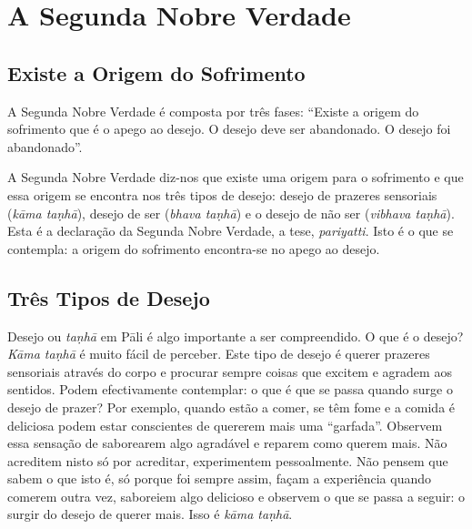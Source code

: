 
\chapter{A Segunda Nobre Verdade}

\section{Existe a Origem do Sofrimento}

A Segunda Nobre Verdade é composta por três fases: “Existe a origem do
sofrimento que é o apego ao desejo. O desejo deve ser abandonado. O desejo foi
abandonado”.

A Segunda Nobre Verdade diz-nos que existe uma origem para o sofrimento e que
essa origem se encontra nos três tipos de desejo: desejo de prazeres sensoriais
(\emph{kāma taṇhā}), desejo de ser (\emph{bhava taṇhā}) e o desejo de não ser
(\emph{vibhava taṇhā}). Esta é a declaração da Segunda Nobre Verdade, a tese,
\emph{pariyatti}. Isto é o que se contempla: a origem do sofrimento encontra-se
no apego ao desejo.

\section{Três Tipos de Desejo}

Desejo ou \emph{taṇhā} em Pāli é algo importante a ser compreendido. O que é o
desejo? \emph{Kāma taṇhā} é muito fácil de perceber. Este tipo de desejo é
querer prazeres sensoriais através do corpo e procurar sempre coisas que excitem
e agradem aos sentidos. Podem efectivamente contemplar: o que é que se passa
quando surge o desejo de prazer? Por exemplo, quando estão a comer, se têm fome
e a comida é deliciosa podem estar conscientes de quererem mais uma “garfada”.
Observem essa sensação de saborearem algo agradável e reparem como querem mais.
Não acreditem nisto só por acreditar, experimentem pessoalmente. Não pensem que
sabem o que isto é, só porque foi sempre assim, façam a experiência quando
comerem outra vez, saboreiem algo delicioso e observem o que se passa a seguir:
o surgir do desejo de querer mais. Isso é \emph{kāma taṇhā}.

